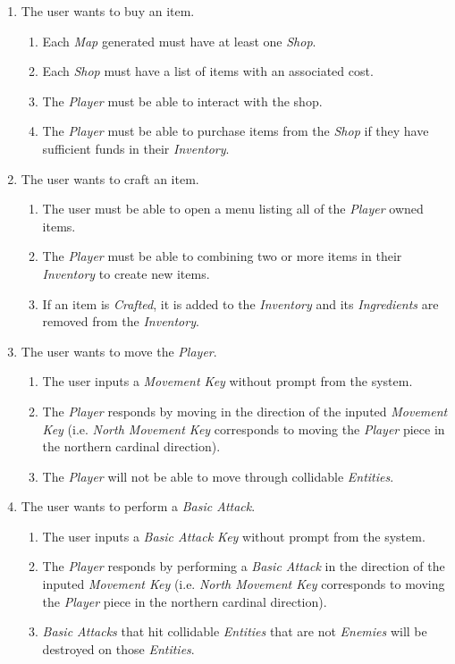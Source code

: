 \documentclass[12pt, titlepage]{article}
\begin{document}
\begin{enumerate}[{VP}1.]
\begin{enumerate}[{BE1}.1]
    \item The user wants to buy an item.
    \begin{enumerate}
      \item Each \textit{Map} generated must have at least one \textit{Shop}.
      \item Each \textit{Shop} must have a list of items with an associated cost.
      \item The \textit{Player} must be able to interact with the shop.
      \item The \textit{Player} must be able to purchase items from the \textit{Shop} if they have sufficient funds in their \textit{Inventory}.
    \end{enumerate}

    \item The user wants to craft an item.
    \begin{enumerate}
      \item The user must be able to open a menu listing all of the \textit{Player} owned items.
      \item The \textit{Player} must be able to combining two or more items in their \textit{Inventory} to create new items.
      \item If an item is \textit{Crafted}, it is added to the \textit{Inventory} and its \textit{Ingredients} are removed from the \textit{Inventory}.
    \end{enumerate}

    \item The user wants to move the \textit{Player}.
    \begin{enumerate}
      \item The user inputs a \textit{Movement Key} without prompt from the system.
      \item The \textit{Player} responds by moving in the direction of the inputed \textit{Movement Key} (i.e. \textit{North Movement Key} corresponds to moving the \textit{Player} piece in the northern cardinal direction).
      \item The \textit{Player} will not be able to move through collidable \textit{Entities}.
    \end{enumerate}

    \item The user wants to perform a \textit{Basic Attack}.
    \begin{enumerate}
      \item The user inputs a \textit{Basic Attack Key} without prompt from the system.
      \item The \textit{Player} responds by performing a \textit{Basic Attack} in the direction of the inputed \textit{Movement Key} (i.e. \textit{North Movement Key} corresponds to moving the \textit{Player} piece in the northern cardinal direction).
      \item \textit{Basic Attacks} that hit collidable \textit{Entities} that are not \textit{Enemies} will be destroyed on those \textit{Entities}.
    \end{enumerate}


\end{enumerate}
\end{enumerate}
\end{document}

